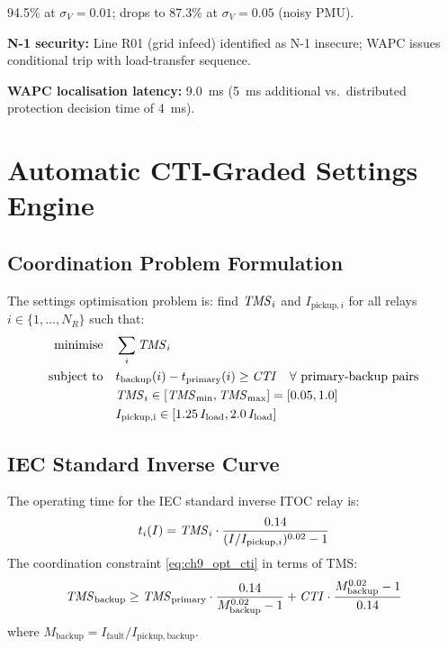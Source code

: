  94.5\% at $\sigma_V = 0.01$;
drops to 87.3\% at $\sigma_V = 0.05$ (noisy PMU).

\textbf{N-1 security:} Line R01 (grid infeed) identified as N-1 insecure;
WAPC issues conditional trip with load-transfer sequence.

\textbf{WAPC localisation latency:} 9.0~ms (5~ms additional vs.\
distributed protection decision time of 4~ms).


\section{Automatic CTI-Graded Settings Engine}
\label{sec:ch11_settings}

\subsection{Coordination Problem Formulation}

The settings optimisation problem is: find $\mathit{TMS}_i$ and $I_{\mathrm{pickup},i}$
for all relays $i \in \{1, \ldots, N_R\}$ such that:
\begin{align}
  \text{minimise} \quad & \sum_i \mathit{TMS}_i
  \label{eq:ch9_opt_obj} \\
  \text{subject to} \quad &
  t_\mathrm{backup}(i) - t_\mathrm{primary}(i) \geq \mathit{CTI} \quad
  \forall \text{ primary-backup pairs}
  \label{eq:ch9_opt_cti} \\
  & \mathit{TMS}_i \in [\mathit{TMS}_\mathrm{min}, \mathit{TMS}_\mathrm{max}] = [0.05, 1.0]
  \label{eq:ch9_opt_tms_bounds} \\
  & I_\mathrm{pickup,i} \in [1.25\,I_\mathrm{load}, 2.0\,I_\mathrm{load}]
  \label{eq:ch9_opt_ip_bounds}
\end{align}

\subsection{IEC Standard Inverse Curve}

The operating time for the IEC standard inverse ITOC relay is:
\begin{equation}
  t_i(I) = \mathit{TMS}_i \cdot \frac{0.14}{(I/I_{\mathrm{pickup},i})^{0.02} - 1}
  \label{eq:ch9_iec_si}
\end{equation}
The coordination constraint \eqref{eq:ch9_opt_cti} in terms of TMS:
\begin{equation}
  \mathit{TMS}_\mathrm{backup} \geq \mathit{TMS}_\mathrm{primary}
    \cdot \frac{0.14}{M_\mathrm{backup}^{0.02} - 1}
    + \mathit{CTI} \cdot \frac{M_\mathrm{backup}^{0.02} - 1}{0.14}
  \label{eq:ch9_cti_tms}
\end{equation}
where $M_\mathrm{backup} = I_\mathrm{fault}/I_\mathrm{pickup,backup}$.

